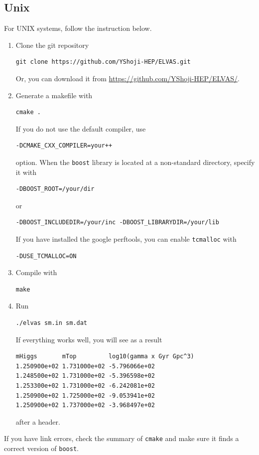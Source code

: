 \documentclass[12pt]{article}
\begin{document}
\subsection{Unix}
For UNIX systems, follow the instruction below.
\begin{enumerate}
 \item Clone the \codename git repository
\begin{lstlisting}[basicstyle=\ttfamily\footnotesize, frame=single]
 git clone https://github.com/YShoji-HEP/ELVAS.git
\end{lstlisting}
Or, you can download it from \href{https://github.com/YShoji-HEP/ELVAS/}{https://github.com/YShoji-HEP/ELVAS/}.
 \item Generate a makefile with
\begin{lstlisting}[basicstyle=\ttfamily\footnotesize, frame=single]
 cmake .
\end{lstlisting}
If you do not use the default compiler, use
\begin{lstlisting}[basicstyle=\ttfamily\footnotesize, frame=single]
-DCMAKE_CXX_COMPILER=your++
\end{lstlisting}
option. When the \verb|boost| library is located at a non-standard
       directory, specify it with
\begin{lstlisting}[basicstyle=\ttfamily\footnotesize, frame=single]
-DBOOST_ROOT=/your/dir
\end{lstlisting}
or
\begin{lstlisting}[basicstyle=\ttfamily\footnotesize, frame=single]
-DBOOST_INCLUDEDIR=/your/inc -DBOOST_LIBRARYDIR=/your/lib
\end{lstlisting}
If you have installed the google perftools, you can enable
       \verb|tcmalloc| with
\begin{lstlisting}[basicstyle=\ttfamily\footnotesize, frame=single]
-DUSE_TCMALLOC=ON
\end{lstlisting}
 \item Compile \codename with
\begin{lstlisting}[basicstyle=\ttfamily\footnotesize, frame=single]
 make
\end{lstlisting}
 \item Run
\begin{lstlisting}[basicstyle=\ttfamily\footnotesize, frame=single]
 ./elvas sm.in sm.dat
\end{lstlisting}
If everything works well, you will see as a result
\begin{lstlisting}[basicstyle=\ttfamily\footnotesize, frame=single]
mHiggs       mTop         log10(gamma x Gyr Gpc^3)
1.250900e+02 1.731000e+02 -5.796066e+02
1.248500e+02 1.731000e+02 -5.396598e+02
1.253300e+02 1.731000e+02 -6.242081e+02
1.250900e+02 1.725000e+02 -9.053941e+02
1.250900e+02 1.737000e+02 -3.968497e+02
\end{lstlisting}
after a header.
\end{enumerate}
If you have link errors, check the summary of
\verb|cmake| and make sure it finds a correct version of \verb|boost|.
\end{document}

